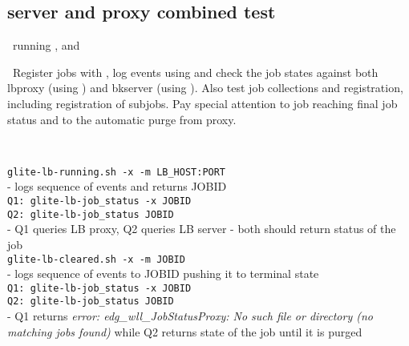 

\subsection{\LB server and proxy combined test}

\req\ running ,  and

\what\ Register jobs with , log events
using  and check the job states against
both lbproxy (using ) and bkserver
(using ). Also test job collections and registration, including registration of subjobs. Pay special attention to job reaching final 
job status and to the automatic purge from proxy.


\how\ 

{\tt glite-lb-running.sh -x -m LB\_HOST:PORT} \\
- logs sequence of events and returns JOBID \\

{\tt Q1: glite-lb-job\_status -x JOBID } \\
{\tt Q2: glite-lb-job\_status JOBID } \\
- Q1 queries LB proxy, Q2 queries LB server - both should return status of the job \\

{\tt glite-lb-cleared.sh -x -m JOBID} \\
- logs sequence of events to JOBID pushing it to terminal state \\

{\tt Q1: glite-lb-job\_status -x JOBID } \\
{\tt Q2: glite-lb-job\_status JOBID } \\
- Q1 returns {\em error: edg\_wll\_JobStatusProxy: No such file or directory (no matching jobs found)} while Q2 returns state of the job until it is purged \\

